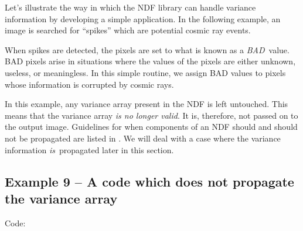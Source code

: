 Let's illustrate the way in which the NDF library can handle variance 
information by developing a simple application. In the following example, 
an image is searched for ``spikes'' which are potential cosmic ray events.

When spikes are detected, the pixels are set to what is known as a
{\em BAD}\, value. BAD pixels arise in situations where the values of the pixels
are either unknown, useless, or meaningless. In this simple routine, we
assign BAD values to pixels whose information is corrupted by cosmic rays.

In this example, any variance array present in the NDF is left untouched.
This means that the variance array {\em is no longer valid}. It is,
therefore, not passed on to the output image. Guidelines for when
components of an NDF should and should not be propagated are listed in
. We will deal with a case where the variance
information {\em is}\, propagated later in this section. 

\subsection{Example 9 -- A code which does not propagate the variance array}

Code:

